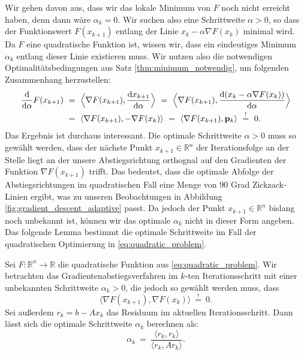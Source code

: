 Wir gehen davon aus, dass wir das lokale Minimum von $F$ noch nicht erreicht haben, denn dann wäre $\alpha_k = 0$.
Wir suchen also eine Schrittweite $\alpha > 0$, so dass der Funktionswert $F(x_{k+1})$ entlang der Linie $x_k - \alpha \nabla F(x_k)$ minimal wird.
Da $F$ eine quadratische Funktion ist, wissen wir, dass ein eindeutiges Minimum $\alpha_k$ entlang dieser Linie existieren muss.
Wir nutzen also die notwendigen Optimalitätsbedingungen aus Satz \ref{thm:minimum_notwendig}, um folgenden Zusammenhang herzustellen:
\begin{equation}
\begin{split}
\frac{\mathrm{d}}{\mathrm{d}\alpha} F(x_{k+1}) \ &= \ \Bigl\langle \nabla F(x_{k+1}), \frac{\mathrm{d}x_{k+1}}{\mathrm{d}\alpha} \Bigr\rangle \ = \ \Bigl\langle \nabla F(x_{k+1}), \frac{\mathrm{d} (x_k - \alpha \nabla F(x_k))}{\mathrm{d}\alpha} \Bigr\rangle \\ 
\ &= \ \langle \nabla F(x_{k+1}), -\nabla F(x_k) \rangle \ = \  \langle \nabla F(x_{k+1}), \vec{p}_k \rangle \ \overset{!}{=} \ 0.
\end{split}
\end{equation}
Das Ergebnis ist durchaus interessant.
Die optimale Schrittweite $\alpha > 0$ muss so gewählt werden, dass der nächste Punkt $x_{k+1} \in \mathbb{R}^n$ der Iterationsfolge an der Stelle liegt an der unsere Abstiegsrichtung orthognal auf den Gradienten der Funktion $\nabla F(x_{k+1})$ trifft.
Das bedeutet, dass die optimale Abfolge der Abstiegsrichtungen im quadratischen Fall eine Menge von $90$ Grad Zickzack-Linien ergibt, was zu unseren Beobachtungen in Abbildung \ref{fig:gradient_descent_adaptive} passt.
Da jedoch der Punkt $x_{k+1} \in \mathbb{R}^n$ bislang noch unbekannt ist, können wir das optimale $\alpha_k$ nicht in dieser Form angeben.
Das folgende Lemma bestimmt die optimale Schrittweite im Fall der quadratischen Optimierung in \eqref{eq:quadratic_problem}.
\begin{lemma}{}{}
Sei $F \colon \mathbb{R}^n \rightarrow \mathbb{R}$ die quadratische Funktion aus \eqref{eq:quadratic_problem}.
Wir betrachten das Gradientenabstiegsverfahren im $k$-ten Iterationsschritt mit einer unbekannten Schrittweite $\alpha_k > 0$, die jedoch so gewählt werden muss, dass
\begin{equation*}
\langle \nabla F(x_{k+1}), \nabla F(x_k) \rangle \ \overset{!}{=} \ 0.
\end{equation*}
Sei außerdem $r_k = b - Ax_k$ das Residuum im aktuellen Iterationsschritt.
Dann lässt sich die optimale Schrittweite $\alpha_k$ berechnen als:
\begin{equation}
\label{eq:optimal_step-size}
\alpha_k \ = \ \frac{\langle r_k, r_k \rangle}{\langle r_k, Ar_k \rangle}.
\end{equation}
\end{lemma}
